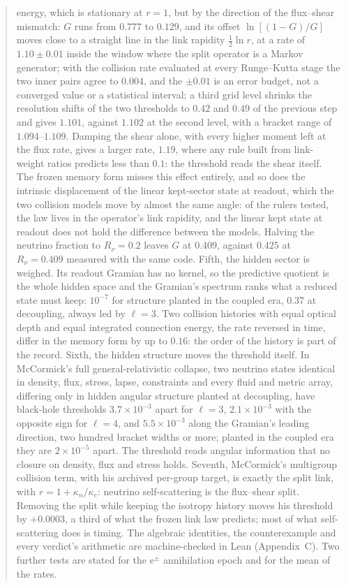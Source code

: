 \documentclass[11pt]{article}
\begin{document}
\begin{abstract}
energy, which is stationary at $r=1$, but by the direction of the flux--shear mismatch: $G$ runs from $0.777$ to $0.129$, and its offset $\ln[(1-G)/G]$ moves close to a straight line in the link rapidity $\tfrac12\ln r$, at a rate of $1.10\pm0.01$ inside the window where the split operator is a Markov generator; with the collision rate evaluated at every Runge--Kutta stage the two inner pairs agree to $0.004$, and the $\pm0.01$ is an error budget, not a converged value or a statistical interval; a third grid level shrinks the resolution shifts of the two thresholds to $0.42$ and $0.49$ of the previous step and gives $1.101$, against $1.102$ at the second level, with a bracket range of $1.094$--$1.109$. Damping the shear alone, with every higher moment left at the flux rate, gives a larger rate, $1.19$, where any rule built from link-weight ratios predicts less than $0.1$: the threshold reads the shear itself. The frozen memory form misses this effect entirely, and so does the intrinsic displacement of the linear kept-sector state at readout, which the two collision models move by almost the same angle: of the rulers tested, the law lives in the operator's link rapidity, and the linear kept state at readout does not hold the difference between the models. Halving the neutrino fraction to $R_\nu=0.2$ leaves $G$ at $0.409$, against $0.425$ at $R_\nu=0.409$ measured with the same code. Fifth, the hidden sector is weighed. Its readout Gramian has no kernel, so the predictive quotient is the whole hidden space and the Gramian's spectrum ranks what a reduced state must keep: $10^{-7}$ for structure planted in the coupled era, $0.37$ at decoupling, always led by $\ell=3$. Two collision histories with equal optical depth and equal integrated connection energy, the rate reversed in time, differ in the memory form by up to $0.16$: the order of the history is part of the record. Sixth, the hidden structure moves the threshold itself. In McCormick's full general-relativistic collapse, two neutrino states identical in density, flux, stress, lapse, constraints and every fluid and metric array, differing only in hidden angular structure planted at decoupling, have black-hole thresholds $3.7\times10^{-3}$ apart for $\ell=3$, $2.1\times10^{-3}$ with the opposite sign for $\ell=4$, and $5.5\times10^{-3}$ along the Gramian's leading direction, two hundred bracket widths or more; planted in the coupled era they are $2\times10^{-5}$ apart. The threshold reads angular information that no closure on density, flux and stress holds. Seventh, McCormick's multigroup collision term, with his archived per-group target, is exactly the split link, with $r=1+\kappa_n/\kappa_e$: neutrino self-scattering is the flux--shear split. Removing the split while keeping the isotropy history moves his threshold by $+0.0003$, a third of what the frozen link law predicts; most of what self-scattering does is timing. The algebraic identities, the counterexample and every verdict's arithmetic are machine-checked in Lean (Appendix~C). Two further tests are stated for the e$^\pm$ annihilation epoch and for the mean of the rates.
\end{abstract}
\end{document}
